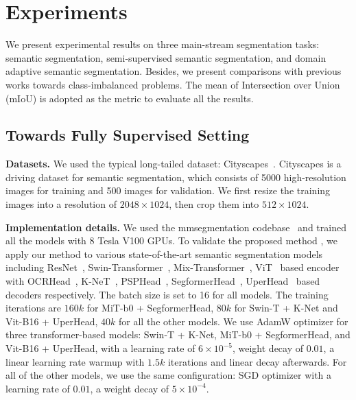\section{Experiments}\label{sec:exp}
We present experimental results on three main-stream segmentation tasks: semantic segmentation, semi-supervised semantic segmentation, and domain adaptive semantic segmentation.
%
Besides, we present comparisons with previous works towards class-imbalanced problems.
%
The mean of Intersection over Union (mIoU) is adopted as the metric to evaluate all the results.


\subsection{Towards Fully Supervised Setting}\label{sec:fully_super}
\noindent\textbf{Datasets.} We used the typical long-tailed dataset: Cityscapes~\cite{cityscapes}.
%
Cityscapes is a driving dataset for semantic segmentation, which consists of 5000 high-resolution images for training and 500 images for validation.
%
We first resize the training images into a resolution of $2048\times1024$, then crop them into $512\times1024$.
%

\noindent\textbf{Implementation details.} 
We used the mmsegmentation codebase~\cite{mmseg2020} and trained all the models with 8 Tesla V100 GPUs.
%
To validate the proposed method \method, we apply our method \method to various state-of-the-art semantic segmentation models including ResNet~\cite{he2016deep}, Swin-Transformer~\cite{liu2021swin}, Mix-Transformer~\cite{xie2021segformer}, ViT~\cite{dosovitskiy2020image} based encoder with OCRHead~\cite{yuan2020object}, K-NeT~\cite{zhang2021k}, PSPHead~\cite{pspnet}, SegformerHead~\cite{xie2021segformer}, UperHead~\cite{xiao2018unified} based decoders respectively.
%
The batch size is set to 16 for all models.
%
The training iterations are $160k$ for MiT-b0 + SegformerHead, $80k$ for Swin-T + K-Net and Vit-B16 + UperHead, $40k$ for all the other models.
%
We use AdamW optimizer for three transformer-based models: Swin-T + K-Net, MiT-b0 + SegformerHead, and Vit-B16 + UperHead, with a learning rate of $6\times10^{-5}$, weight decay of $0.01$, a linear learning rate warmup with $1.5k$ iterations and linear decay afterwards.
%
For all of the other models, we use the same configuration: SGD optimizer with a learning rate of $0.01$, a weight decay of $5\times 10^{-4}$.


